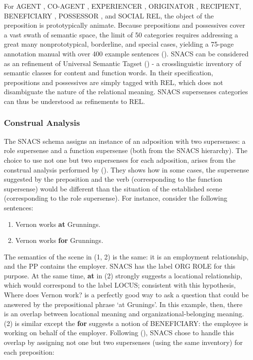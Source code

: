 For AGENT , CO-AGENT , EXPERIENCER , ORIGINATOR , RECIPIENT, BENEFICIARY , POSSESSOR , and SOCIAL REL, the object of the preposition is prototypically animate. Because prepositions and possessives cover a vast swath of semantic space, the limit of 50 categories requires addressing a great many nonprototypical, borderline, and special cases, yielding a 75-page annotation manual with over 400 example sentences (\cite{schneider-18-arxiv}). SNACS can be considered as an refinement of Universal Semantic Tagset (\cite{abzianidze-17}) - a crosslinguistic inventory of semantic classes for content and function words. In their specification, prepositions and possessives are simply tagged with REL, which does not disambiguate the nature of the relational meaning. SNACS supersenses categories can thus be understood as refinements to REL.

\subsubsection{Construal Analysis} \label{sec:construal}

The SNACS schema assigns an instance of an adposition with two supersenses: a role supersense and a function supersense (both from the SNACS hierarchy). The choice to use not one but two supersenses for each adposition, arises from the construal analysis performed by (\cite{hwang-17}). They shows how in some cases, the supersense suggested by the preposition and the verb (corresponding to the function supersense) would be different than the situation of the established scene (corresponding to the role supersense). For instance, consider the following sentences:

\begin{enumerate}
    \item Vernon works \textbf{at} Grunnings.
    \item Vernon works \textbf{for} Grunnings.
\end{enumerate}

The semantics of the scene in (1, 2) is the same: it is an employment relationship, and the PP contains the employer. SNACS has the label ORG ROLE for this purpose. At the same time, \textbf{at} in (2) strongly suggests a locational relationship, which would correspond to the label LOCUS; consistent with this hypothesis, Where does Vernon work? is a perfectly good way to ask a question that could be answered by the prepositional phrase ‘at Grunings’. In this example, then, there is an overlap between locational meaning and organizational-belonging meaning. (2) is similar except the \textbf{for} suggests a notion of BENEFICIARY: the employee is working on behalf of the employer. Following (\cite{hwang-17}), SNACS chose to handle this overlap by assigning not one but two supersenses (using the same inventory) for each preposition:

